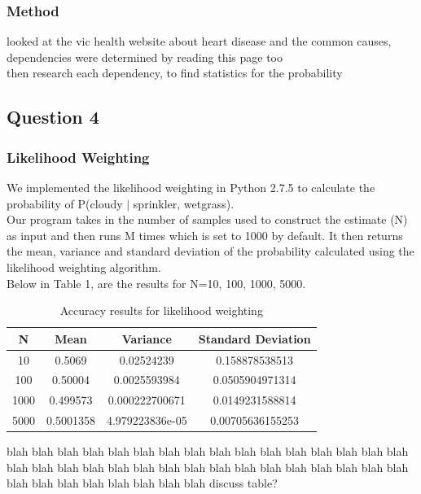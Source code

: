 \documentclass{article}
\begin{document}
\subsubsection{Method}
looked at the vic health website about heart disease and the common causes, dependencies were determined by reading this page too \\

then research each dependency, to find statistics for the probability

\subsection{Question 4}
\subsubsection{Likelihood Weighting}

We implemented the likelihood weighting in Python 2.7.5 to calculate the probability of P(cloudy $|$ sprinkler, wetgrass). \\

Our program takes in the number of samples used to construct the estimate (N) as input and then runs M times which is set to 1000 by default. It then returns the mean, variance and standard deviation of the probability calculated using the likelihood weighting algorithm.\\

Below in Table 1, are the results for N=10, 100, 1000, 5000.

\begin{table}[h]
\centering
\begin{tabular}{|c|c|c|c|}
\hline
N    & Mean      & Variance        & Standard Deviation \\ \hline
10   & 0.5069    & 0.02524239      & 0.158878538513     \\ \hline
100  & 0.50004   & 0.0025593984    & 0.0505904971314    \\ \hline
1000 & 0.499573  & 0.000222700671  & 0.0149231588814    \\ \hline
5000 & 0.5001358 & 4.979223836e-05 & 0.00705636155253   \\ \hline
\end{tabular}
\caption {Accuracy results for likelihood weighting}
\end{table}

blah blah blah blah blah blah blah blah blah blah blah blah blah blah blah blah blah blah blah blah blah blah blah blah blah blah blah blah blah blah blah blah blah blah blah blah blah blah blah blah discuss table?
\end{document}
